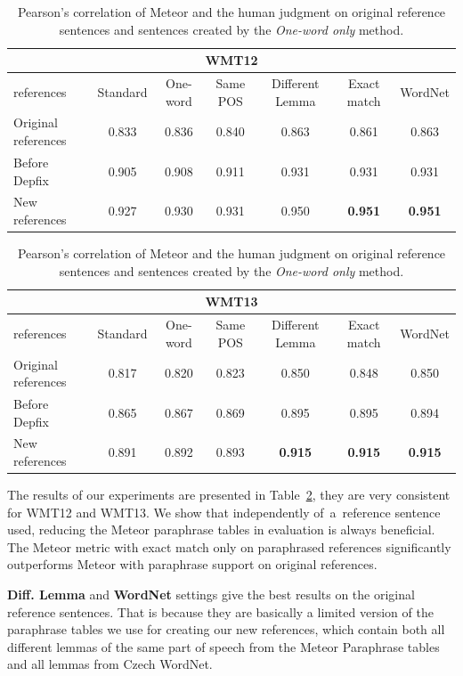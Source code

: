 \documentclass[11pt]{article}
\def\Tref#1{Table~\ref{#1}}
\begin{document}
\begin{table}[tb]
\begin{center}
\begin{tabular}{l|cccccc}
\multicolumn{7}{c}{\textbf{WMT12}}\\
\hline
references & Standard & One-word & Same POS &  Different Lemma & Exact match & WordNet \\
\hline
Original references & 0.833 & 0.836 & 0.840 & 0.863 & 0.861 & 0.863 \\
Before Depfix & 0.905 & 0.908 & 0.911 & 0.931 & 0.931 & 0.931 \\
New references & 0.927 & 0.930 & 0.931 & 0.950 & \textbf{0.951} & \textbf{0.951} \\
\end{tabular}

\vspace{10pt}

\begin{tabular}{l|cccccc}
\multicolumn{7}{c}{\textbf{WMT13}}\\
\hline
references & Standard & One-word & Same POS & Different Lemma & Exact match & WordNet \\
\hline
Original references & 0.817 & 0.820 & 0.823 & 0.850 & 0.848 & 0.850 \\
Before Depfix  & 0.865 & 0.867 & 0.869 & 0.895 & 0.895 & 0.894 \\
New references & 0.891 & 0.892 & 0.893 & \textbf{0.915} & \textbf{0.915} & \textbf{0.915} \\
\end{tabular}
\caption{Pearson's correlation of Meteor and the human judgment on original reference sentences and sentences created by the \textit{One-word only} method.}
\label{meteor_results}
\end{center}
\end{table}

The results of our experiments are presented in \Tref{meteor_results}, they are 
very consistent for WMT12 and WMT13. We show that independently of~a~reference 
sentence used, reducing the Meteor paraphrase tables in evaluation is always 
beneficial. The Meteor metric with exact match only on paraphrased references 
significantly outperforms Meteor with paraphrase support on original 
references.

\textbf{Diff. Lemma} and \textbf{WordNet} settings give the best results on the 
original reference sentences. That is because they are basically a limited 
version of the paraphrase tables we use for creating our new references, which 
contain both all different lemmas of the same part of speech from the Meteor 
Paraphrase tables and all lemmas from Czech WordNet.
\end{document}
